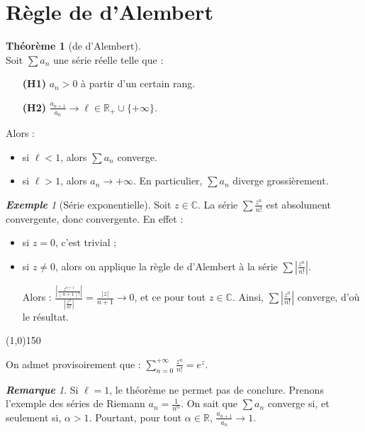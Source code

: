 \documentclass[12pt]{book}
\let\ensembleNombre\mathbb
\newcommand*\R{\ensuremath{\ensembleNombre{R}}}
\newcommand*\C{\ensuremath{\ensembleNombre{C}}}
\newcommand{\hr}{\begin{center}
					\line(1,0){150}
 				 \end{center}}
\theoremstyle{definition}
\newtheorem{thme}{Théorème}[chapter]
\theoremstyle{remark}
\newtheorem*{rem}{\textbf{Remarque}}
\newtheorem*{ex}{\textbf{Exemple}}
\newenvironment{fthme}
  {\begin{mdframed}[roundcorner=10pt, linewidth=2pt]\begin{thme}}
  {\end{thme}\end{mdframed}}
\begin{document}
	\section{Règle de d'Alembert}
	\begin{fthme}[de d'Alembert] \mbox{~}\\
	Soit $\sum a_n$ une série réelle telle que :
		\begin{itemize}
		\item[\textbf{(H1)}] $a_n > 0$ à partir d'un certain rang.
		\item[\textbf{(H2)}] $\frac{a_{n+1}}{a_n} \longrightarrow \ell \in \R_+ \cup \lbrace +\infty \rbrace$.
		\end{itemize}
		
	\noindent Alors : 
		\begin{itemize}
		\item si $\ell < 1$, alors $\sum a_n$ converge.
		\item si $\ell > 1$, alors $a_n \longrightarrow +\infty$. En particulier, $\sum a_n$ diverge grossièrement.
		\end{itemize}
	\end{fthme}
	
	\begin{ex}[Série exponentielle]
	Soit $z\in \C$. La série $\sum \frac{z^n}{n!}$ est absolument convergente, donc convergente. En effet :
	\begin{itemize}
	\item si $z = 0$, c'est trivial ; 
	\item si $z \neq 0$, alors on applique la règle de d'Alembert à la série $\sum \left|\frac{z^n}{n!} \right|$. 
	
	Alors : $\frac{ \left| \frac{z^{n+1}}{(n+1)!} \right| }{\left| \frac{z^n}{n!} \right|} = \frac{|z|}{n+1} \longrightarrow 0$, et ce pour tout $z \in \C$. Ainsi, $\sum \left|\frac{z^n}{n!} \right|$ converge, d'où le résultat.
	\end{itemize}
	\end{ex}
	
\hr
	On admet provisoirement que : $\boxed{ \sum_{n=0}^{+\infty} \frac{z^n}{n!} = e^z}$.
	
	\begin{rem}
	Si $\ell = 1$, le théorème ne permet pas de conclure. Prenons l'exemple des séries de Riemann $a_n = \frac{1}{n^\alpha}$. On sait que $\sum a_n$ converge si, et seulement si, $\alpha > 1$. Pourtant, pour tout $\alpha \in \R$, $\frac{a_{n+1}}{a_n} \longrightarrow 1$.
	\end{rem}
	
\end{document}
